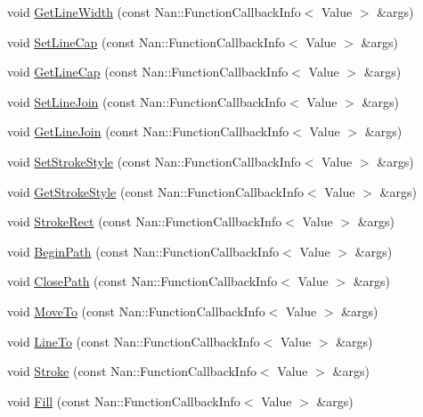 \begin{DoxyCompactItemize}
\item 
void \hyperlink{namespaceinfoscreen_ab8ec592e847df10a32b04c9cb707b3bb}{Get\+Line\+Width} (const Nan\+::\+Function\+Callback\+Info$<$ Value $>$ \&args)
\item 
void \hyperlink{namespaceinfoscreen_a0b25fa8d520fcdcc980547f02b9e876d}{Set\+Line\+Cap} (const Nan\+::\+Function\+Callback\+Info$<$ Value $>$ \&args)
\item 
void \hyperlink{namespaceinfoscreen_a675326ef96431b4281bf52ab16ab51b1}{Get\+Line\+Cap} (const Nan\+::\+Function\+Callback\+Info$<$ Value $>$ \&args)
\item 
void \hyperlink{namespaceinfoscreen_a71630b2aea4ddb97d899d8c0fa049f75}{Set\+Line\+Join} (const Nan\+::\+Function\+Callback\+Info$<$ Value $>$ \&args)
\item 
void \hyperlink{namespaceinfoscreen_adf0f0c516e2523ed28d7783da9ce52d4}{Get\+Line\+Join} (const Nan\+::\+Function\+Callback\+Info$<$ Value $>$ \&args)
\item 
void \hyperlink{namespaceinfoscreen_aecb2c16949947bf1ac199044ec6c26e6}{Set\+Stroke\+Style} (const Nan\+::\+Function\+Callback\+Info$<$ Value $>$ \&args)
\item 
void \hyperlink{namespaceinfoscreen_add7eab330345f4c71ce26ce239aa648b}{Get\+Stroke\+Style} (const Nan\+::\+Function\+Callback\+Info$<$ Value $>$ \&args)
\item 
void \hyperlink{namespaceinfoscreen_a1c07256051e29c209238308fe36e2ec2}{Stroke\+Rect} (const Nan\+::\+Function\+Callback\+Info$<$ Value $>$ \&args)
\item 
void \hyperlink{namespaceinfoscreen_a5fb3e35b7902d6aa0ae72daa2a96015d}{Begin\+Path} (const Nan\+::\+Function\+Callback\+Info$<$ Value $>$ \&args)
\item 
void \hyperlink{namespaceinfoscreen_a88c757298a71ed5d65576c50f2000a8b}{Close\+Path} (const Nan\+::\+Function\+Callback\+Info$<$ Value $>$ \&args)
\item 
void \hyperlink{namespaceinfoscreen_afc457deddf975fa7781272c811ac6635}{Move\+To} (const Nan\+::\+Function\+Callback\+Info$<$ Value $>$ \&args)
\item 
void \hyperlink{namespaceinfoscreen_af3e61d225be7d352b25503bd8694ab3a}{Line\+To} (const Nan\+::\+Function\+Callback\+Info$<$ Value $>$ \&args)
\item 
void \hyperlink{namespaceinfoscreen_a306213bef8f6d9386e8564f52216d84e}{Stroke} (const Nan\+::\+Function\+Callback\+Info$<$ Value $>$ \&args)
\item 
void \hyperlink{namespaceinfoscreen_a5d414b81120db7ff88962452c696e06e}{Fill} (const Nan\+::\+Function\+Callback\+Info$<$ Value $>$ \&args)

\end{DoxyCompactItemize}
